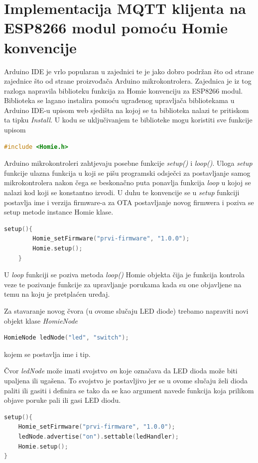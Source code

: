 \documentclass[times, utf8, zavrsni]{fer}
\begin{document}
\section{Implementacija MQTT klijenta na ESP8266 modul pomoću Homie konvencije}
Arduino IDE je vrlo popularan u zajednici te je jako dobro podržan što od strane zajednice što od strane proizvođača Arduino mikrokontrolera.
Zajednica je iz tog razloga napravila biblioteku funkcija za Homie konvenciju za ESP8266 modul.
Biblioteka se lagano instalira pomoću ugrađenog upravljača bibliotekama u Arduino IDE-u upisom web sjedišta na kojoj se ta biblioteka nalazi te pritiskom ta tipku \textit{Install}.
U kodu se uključivanjem te biblioteke mogu koristiti sve funkcije upisom
\begin{lstlisting}[language=c++, caption=Uključivanje Homie biblioteke]
    #include <Homie.h>
\end{lstlisting}

Arduino mikrokontroleri zahtjevaju posebne funkcije \textit{setup()} i \textit{loop()}.
Uloga \textit{setup} funkcije ulazna funkcija u koji se pišu programski odsječci za postavljanje samog mikrokontrolera nakon čega se beskonačno puta ponavlja funkcija \textit{loop} u kojoj se nalazi kod koji se konstantno izvodi.
U duhu te konvencije se u \textit{setup} funkciji postavlja ime i verzija firmware-a za OTA postavljanje novog firmwera i poziva se setup metode instance Homie klase.
\begin{lstlisting}[language=c++]
    setup(){
        Homie_setFirmware("prvi-firmware", "1.0.0");
        Homie.setup();
    }
\end{lstlisting}

U \textit{loop} funkciji se poziva metoda \textit{loop()} Homie objekta čija je funkcija kontrola veze te pozivanje funkcije za upravljanje porukama kada su one objavljene na temu na koju je pretplaćen uređaj.

Za stavaranje novog čvora (u ovome slučaju LED diode) trebamo napraviti novi objekt klase \textit{HomieNode}
\begin{lstlisting}[language=c++]
HomieNode ledNode("led", "switch");
\end{lstlisting}
kojem se postavlja ime i tip.

Čvor \textit{ledNode} može imati svojstvo \textit{on} koje označava da LED dioda može biti upaljena ili ugašena.
To svojstvo je postavljivo jer se u ovome slučaju želi dioda paliti ili gasiti i definira se tako da se kao argument navede funkcija koja prilikom objave poruke pali ili gasi LED diodu.
\begin{lstlisting}[language=c++]
setup(){
    Homie_setFirmware("prvi-firmware", "1.0.0");
    ledNode.advertise("on").settable(ledHandler);
    Homie.setup();
}
\end{lstlisting}
\end{document}
